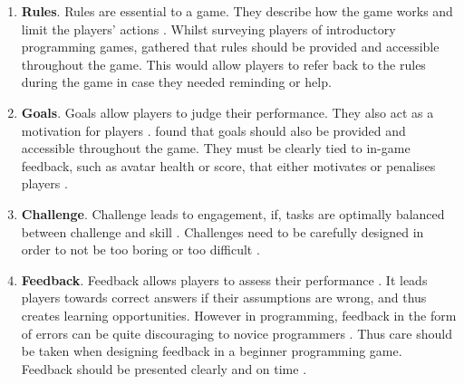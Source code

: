 \documentclass[a4paper,11.5pt]{report}
\numberwithin{figure}{section}
\numberwithin{table}{section}
\numberwithin{equation}{section}
\numberwithin{equation}{section}
\begin{document}
\begin{enumerate}
	\item \textbf{Rules}. Rules are essential to a game. They describe how the game works and limit the players' actions \citep{roungas2015}. Whilst surveying players of introductory programming games, \citet{Barnes2007} gathered that rules should be provided and accessible throughout the game. This would allow players to refer back to the rules during the game in case they needed reminding or help.

	\item \textbf{Goals}. Goals allow players to judge their performance. They also act as a motivation for players \citep{roungas2015}. \citep{Barnes2007} found that goals should also be provided and accessible throughout the game. They must be clearly tied to in-game feedback, such as avatar health or score, that either motivates or penalises players \citep{Barnes2007}.
	
	\item \textbf{Challenge}. Challenge leads to engagement, if, tasks are optimally balanced between challenge and skill \citep{whitton2011, flow}. Challenges need to be carefully designed in order to not be too boring or too difficult \citep{roungas2015}.
	
	\item \textbf{Feedback}. Feedback allows players to assess their performance \citep{roungas2015}. It leads players towards correct answers if their assumptions are wrong, and thus creates learning opportunities. However in programming, feedback in the form of errors can be quite discouraging to novice programmers \citep{lee2011}. Thus care should be taken when designing feedback in a beginner programming game. Feedback should be presented clearly and on time \citep{roungas2015}.
\end{enumerate}











\end{document}
